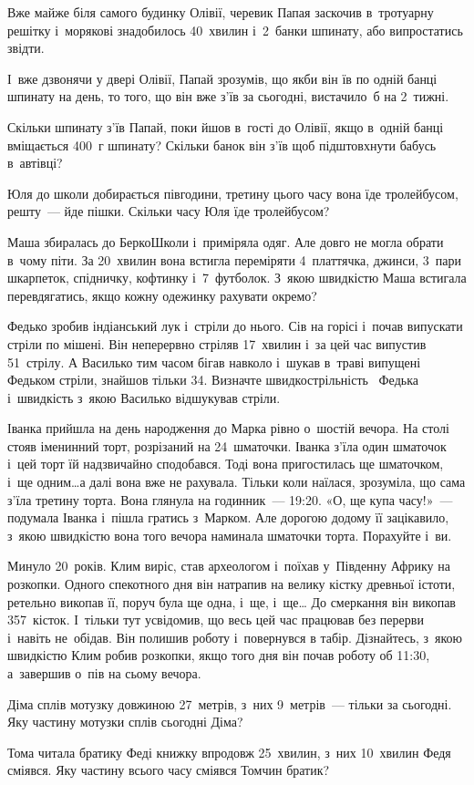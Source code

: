Вже майже біля самого будинку Олівії, черевик Папая заскочив в~тротуарну
решітку і~морякові знадобилось 40~хвилин і~2~банки шпинату,
або випростатись звідти.

І~вже дзвонячи у двері Олівії, Папай зрозумів, що якби він їв по одній
банці шпинату на день, то того, що він вже з’їв за сьогодні,
вистачило~б на 2~тижні.

Скільки шпинату з’їв Папай, поки йшов в~гості до Олівії, якщо в~одній
банці вміщається 400~г шпинату?
Скільки банок він з’їв щоб підштовхнути бабусь в~автівці?


\problem
Юля до школи добирається півгодини,
третину цього часу вона їде тролейбусом, решту~--- йде пішки.
Скільки часу Юля їде тролейбусом?


\problem
Маша збиралась до БеркоШколи і~приміряла одяг.
Але довго не могла обрати в~чому піти.
За 20~хвилин вона встигла переміряти 4~платтячка, джинси, 3~пари шкарпеток,
спідничку, кофтинку і~7~футболок.
З~якою швидкістю Маша встигала перевдягатись,
якщо кожну одежинку рахувати окремо?


\problem
Федько зробив індіанський лук і~стріли до нього.
Сів на горісі і~почав випускати стріли по мішені.
Він неперервно стріляв 17~хвилин і~за цей час випустив 51~стрілу.
А Василько тим часом бігав навколо і~шукав в~траві випущені Федьком стріли,
знайшов тільки 34.
Визначте швидкострільність  Федька і~швидкість з~якою Василько
відшукував стріли.


\problem
Іванка прийшла на день народження до Марка рівно о~шостій вечора.
На столі стояв іменинний торт, розрізаний на 24~шматочки.
Іванка з’їла один шматочок і~цей торт їй надзвичайно сподобався.
Тоді вона пригостилась ще шматочком, і~ще одним\ldots а далі вона вже не рахувала.
Тільки коли наїлася, зрозуміла, що сама з’їла третину торта.
Вона глянула на годинник~--- 19:20.
«О, ще купа часу!»~--- подумала Іванка і~пішла гратись з~Марком.
Але дорогою додому її зацікавило, з~якою швидкістю вона того
вечора наминала шматочки торта. Порахуйте і~ви.


\problem
Минуло 20~років. Клим виріс, став археологом і~поїхав у~Південну Африку
на розкопки. Одного спекотного дня він натрапив на велику кістку
древньої істоти, ретельно викопав її, поруч була ще одна, і~ще, і~ще\ldots
До смеркання він викопав 357~кісток. І~тільки тут усвідомив, що весь
цей час працював без перерви і~навіть не~обідав. Він полишив роботу
і~повернувся в табір. Дізнайтесь, з~якою швидкістю Клим робив розкопки,
якщо того дня він почав роботу об 11:30, а~завершив о~пів на сьому вечора.


\problem
Діма сплів мотузку довжиною 27~метрів, з~них 9~метрів~--- тільки за сьогодні.
Яку частину мотузки сплів сьогодні Діма?


\problem
Тома читала братику Феді книжку впродовж 25~хвилин,
з~них 10~хвилин Федя сміявся.
Яку частину всього часу сміявся Томчин братик?
